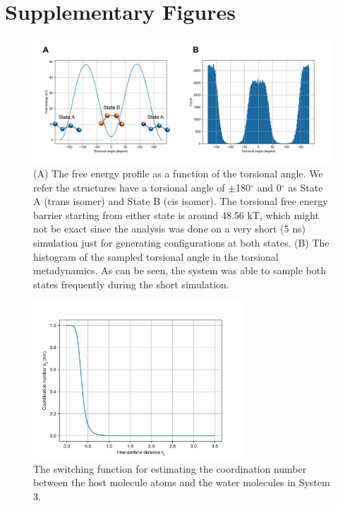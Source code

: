 \documentclass[journal=jacsat,manuscript=article]{achemso}
\begin{document}
\section{Supplementary Figures}
\renewcommand{\thefigure}{S\arabic{figure}}
\begin{figure}[H]
    \centering
    \includegraphics[width=\textwidth]{Figures/sys2_torsional_MetaD_annotated.png}   
    \caption{(A) The free energy profile as a function of the torsional angle. We refer the structures have a torsional angle of $\pm$180$^{\circ}$ and 0$^{\circ}$ as State A (trans isomer) and State B (cis isomer). The torsional free energy barrier starting from either state is around 48.56 kT, which might not be exact since the analysis was done on a very short (5 ns) simulation just for generating configurations at both states. (B) The histogram of the sampled torsional angle in the torsional metadynamics. As can be seen, the system was able to sample both states frequently during the short simulation.}
    \label{sys2_torsional_MetaD}
\end{figure}

\renewcommand{\thefigure}{S\arabic{figure}}
\begin{figure}[H]
    \centering
    \includegraphics[width=0.7\textwidth]{Figures/switching_fn.png}   
    \caption{The switching function for estimating the coordination number between the host molecule atoms and the water molecules in System 3.}
    \label{switching}
\end{figure}
\end{document}

